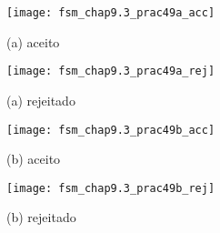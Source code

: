 \begin{table}[H]
    \begin{minipage}[b]{0.5\linewidth}
        \begin{figure}[H]
            \centering
            \texttt{[image: fsm\_chap9.3\_prac49a\_acc]}
            \caption{(a) aceito}
            \label{fig:fsm_chap9.3_prac49a_acc}
        \end{figure}
    \end{minipage}%
    \begin{minipage}[b]{0.5\linewidth}
        \begin{figure}[H]
            \centering
            \texttt{[image: fsm\_chap9.3\_prac49a\_rej]}
            \caption{(a) rejeitado}
            \label{fig:fsm_chap9.3_prac49a_rej}
        \end{figure}
    \end{minipage}
    \newline
    \begin{minipage}[b]{0.5\linewidth}
        \begin{figure}[H]
            \centering
            \texttt{[image: fsm\_chap9.3\_prac49b\_acc]}
            \caption{(b) aceito}
            \label{fig:fsm_chap9.3_prac49b_acc}
        \end{figure}
    \end{minipage}%
    \begin{minipage}[b]{0.5\linewidth}
        \begin{figure}[H]
            \centering
            \texttt{[image: fsm\_chap9.3\_prac49b\_rej]}
            \caption{(b) rejeitado}
            \label{fig:fsm_chap9.3_prac49b_rej}
        \end{figure}
    \end{minipage}
\end{table}

